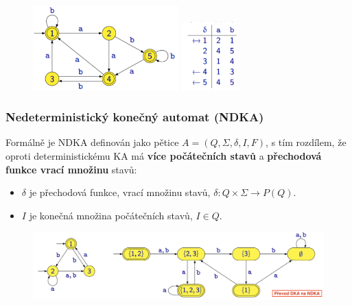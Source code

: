 \begin{figure}[H]
	\centering
	\includegraphics[width=0.5\textwidth]{assets/deter}
	\includegraphics[width=0.2\textwidth]{assets/deter1}
\end{figure}

\subsubsection{Nedeterministický konečný automat (NDKA)}
Formálně je NDKA definován jako pětice $A = (Q, \Sigma, \delta, I, F)$, s tím rozdílem, že oproti deterministickému KA má \textbf{více počátečních stavů} a \textbf{přechodová funkce vrací množinu} stavů:
\begin{itemize}
	\item $\delta$ je přechodová funkce, vrací množinu stavů, $\delta: Q \times \Sigma \rightarrow P(Q)$.
	\item $I$ je konečná množina počátečních stavů, $I \in Q$.
\end{itemize}

\begin{figure}[H]
\centering
\includegraphics[width=1\textwidth]{assets/nka_na_dka}
\end{figure}

